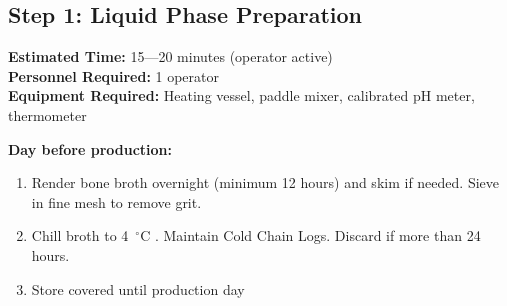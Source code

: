 
\subsection*{Step 1: Liquid Phase Preparation}

\textbf{Estimated Time:} 15---20 minutes (operator active) \\
\textbf{Personnel Required:} 1 operator \\
\textbf{Equipment Required:} Heating vessel, paddle mixer, calibrated pH meter, thermometer

\vspace{0.5em}
\textbf{Day before production:}
\begin{enumerate}[leftmargin=1.5em]
\item Render bone broth overnight (minimum 12 hours) and skim if needed. Sieve in fine mesh to remove grit. 
\item Chill broth to 4~$^\circ$C . Maintain Cold Chain Logs. Discard if more than 24 hours. 
\item Store covered until production day
\end{enumerate}

